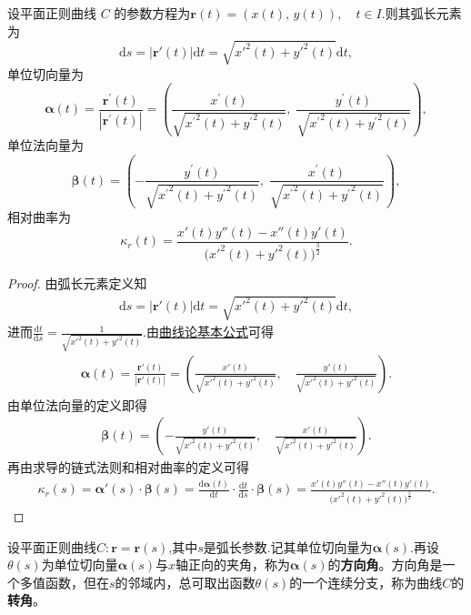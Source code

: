 \documentclass[../../main.tex]{subfiles}%
\begin{document}
\begin{theorem}\label{theorem:平面曲线一般参数公式}
设平面正则曲线 \(C\) 的参数方程为$\boldsymbol{r}(t) = (x(t),\, y(t)), \quad t \in I$.则其弧长元素为
\[
\mathrm{d}s=\left| \boldsymbol{r}' \left( t \right) \right|\mathrm{d}t=\sqrt{x'^2\left( t \right) +y'^2\left( t \right)}\mathrm{d}t,
\]
单位切向量为
\[
\boldsymbol{\alpha }\left( t \right) =\frac{\boldsymbol{r}^{\prime}\left( t \right)}{\left| \boldsymbol{r}^{\prime}\left( t \right) \right|}=\left( \frac{x^{\prime}\left( t \right)}{\sqrt{{x^{\prime}}^2\left( t \right) +{y^{\prime}}^2\left( t \right)}},\;\frac{y^{\prime}\left( t \right)}{\sqrt{{x^{\prime}}^2\left( t \right) +{y^{\prime}}^2\left( t \right)}} \right) ,
\]
单位法向量为
\[
\boldsymbol{\beta }\left( t \right) =\left( -\frac{y^{\prime}\left( t \right)}{\sqrt{{x^{\prime}}^2\left( t \right) +{y^{\prime}}^2\left( t \right)}},\;\frac{x^{\prime}\left( t \right)}{\sqrt{{x^{\prime}}^2\left( t \right) +{y^{\prime}}^2\left( t \right)}} \right) ,
\]
相对曲率为
\[
\kappa_r(t) = \frac{x'(t)y''(t) - x''(t)y'(t)}{\bigl(x'^2(t) + y'^2(t)\bigr)^{\frac{3}{2}}}.
\]
\end{theorem}
\begin{proof}

由弧长元素定义知
\begin{align*}
\mathrm{d}s=|\bm{r}'(t)|\mathrm{d}t=\sqrt{x'^2(t)+y'^2(t)}\mathrm{d}t,
\end{align*}
进而$\frac{\mathrm{d}t}{\mathrm{d}s}=\frac{1}{\sqrt{x'^2(t)+y'^2(t)}}.$由\hyperref[theorem:曲线论基本公式]{曲线论基本公式}可得
\begin{align*}
\bm{\alpha}(t)=\frac{\bm{r}'(t)}{|\bm{r}'(t)|}=\left( \frac{x'(t)}{\sqrt{x'^2(t)+y'^2(t)}},\quad\frac{y'(t)}{\sqrt{x'^2(t)+y'^2(t)}} \right).
\end{align*}
由单位法向量的定义即得
\begin{align*}
\bm{\beta}(t)=\left( -\frac{y'(t)}{\sqrt{x'^2(t)+y'^2(t)}},\quad\frac{x'(t)}{\sqrt{x'^2(t)+y'^2(t)}} \right).
\end{align*}
再由求导的链式法则和相对曲率的定义可得
\begin{align*}
\kappa_r(s)=\bm{\alpha}'(s)\cdot\bm{\beta}(s)=\frac{\mathrm{d}\bm{\alpha}(t)}{\mathrm{d}t}\cdot\frac{\mathrm{d}t}{\mathrm{d}s}\cdot\bm{\beta}(s)=\frac{x'(t)y''(t)-x''(t)y'(t)}{\bigl( x'^2(t)+y'^2(t) \bigr)^{\frac{3}{2}}}.
\end{align*}

\end{proof}

\begin{definition}
设平面正则曲线$C:\bm{r}=\bm{r}(s)$,其中$s$是弧长参数.记其单位切向量为$\bm{\alpha}(s)$.再设$\theta(s)$为单位切向量$\bm{\alpha}(s)$与$x$轴正向的夹角，称为$\bm{\alpha}(s)$的\textbf{方向角}。方向角是一个多值函数，但在$s$的邻域内，总可取出函数$\theta(s)$的一个连续分支，称为曲线$C$的\textbf{转角}。
\end{definition}
\end{document}
